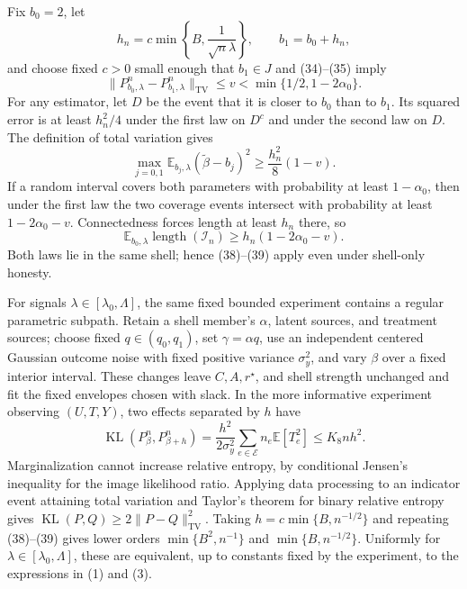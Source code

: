 Fix \(b_0=2\), let
\[
 h_n=c\min\left\{B,\frac1{\sqrt n\lambda}\right\},
 \qquad b_1=b_0+h_n,                                                       \tag{36}
\]
and choose fixed \(c>0\) small enough that \(b_1\in J\) and (34)--(35) imply
\[
 \|P_{b_0,\lambda}^{n}-P_{b_1,\lambda}^{n}\|_{\mathrm{TV}}
 \leq v<\min\{1/2,1-2\alpha_0\}.                                       \tag{37}
\]
For any estimator, let \(D\) be the event that it is closer to \(b_0\) than to \(b_1\).  Its squared error is at least \(h_n^2/4\) under the first law on \(D^c\) and under the second law on \(D\).  The definition of total variation gives
\[
 \max_{j=0,1}\mathbb E_{b_j,\lambda}
 (\widetilde\beta-b_j)^2\geq\frac{h_n^2}{8}(1-v).                        \tag{38}
\]
If a random interval covers both parameters with probability at least \(1-\alpha_0\), then under the first law the two coverage events intersect with probability at least \(1-2\alpha_0-v\).  Connectedness forces length at least \(h_n\) there, so
\[
 \mathbb E_{b_0,\lambda}\operatorname{length}(\mathcal I_n)
 \geq h_n(1-2\alpha_0-v).                                                \tag{39}
\]
Both laws lie in the same shell; hence (38)--(39) apply even under shell-only honesty.

For signals \(\lambda\in[\lambda_0,\Lambda]\), the same fixed bounded experiment contains a regular parametric subpath.  Retain a shell member's \(\alpha\), latent sources, and treatment sources; choose fixed \(q\in(q_0,q_1)\), set \(\gamma=\alpha q\), use an independent centered Gaussian outcome noise with fixed positive variance \(\sigma_y^2\), and vary \(\beta\) over a fixed interior interval.  These changes leave \(C,A,r^\star\), and shell strength unchanged and fit the fixed envelopes chosen with slack.  In the more informative experiment observing \((U,T,Y)\), two effects separated by \(h\) have
\[
 \operatorname{KL}(P_\beta^n,P_{\beta+h}^n)
 =\frac{h^2}{2\sigma_y^2}
   \sum_{e\in\mathcal E}n_e\mathbb E[T_e^2]
 \leq K_8nh^2.                                                           \tag{40}
\]
Marginalization cannot increase relative entropy, by conditional Jensen's inequality for the image likelihood ratio.  Applying data processing to an indicator event attaining total variation and Taylor's theorem for binary relative entropy gives \(\operatorname{KL}(P,Q)\geq2\|P-Q\|_{\mathrm{TV}}^2\).  Taking \(h=c\min\{B,n^{-1/2}\}\) and repeating (38)--(39) gives lower orders \(\min\{B^2,n^{-1}\}\) and \(\min\{B,n^{-1/2}\}\).  Uniformly for \(\lambda\in[\lambda_0,\Lambda]\), these are equivalent, up to constants fixed by the experiment, to the expressions in (1) and (3).

